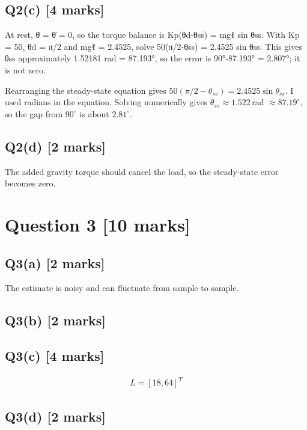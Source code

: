 \documentclass[11pt,a4paper]{article}
\begin{document}
\subsection*{Q2(c) \hfill [4 marks]}

At rest, θ̇ = θ̈ = 0, so the torque balance is Kp(θd-θss) = mgℓ sin θss.
With Kp = 50, θd = π/2 and mgℓ = 2.4525, solve 50(π/2-θss) = 2.4525 sin θss.
This gives θss approximately 1.52181 rad = 87.193°, so the error is 90°-87.193° = 2.807°; it is not zero.\par\smallskip Rearranging the steady-state equation gives $50(\pi/2-\theta_{ss})=2.4525\sin\theta_{ss}$. I used radians in the equation. Solving numerically gives $\theta_{ss}\approx1.522\,$rad $\approx87.19^\circ$, so the gap from $90^\circ$ is about $2.81^\circ$.

\subsection*{Q2(d) \hfill [2 marks]}

The added gravity torque should cancel the load, so the steady-state error becomes zero. 
\section*{Question 3 \hfill [10 marks]}
\subsection*{Q3(a) \hfill [2 marks]}

The estimate is noisy and can fluctuate from sample to sample.

\subsection*{Q3(b) \hfill [2 marks]}

\vspace{2mm}

\subsection*{Q3(c) \hfill [4 marks]}

\[\begin{aligned}L = [18,64]^T\end{aligned}\]

\subsection*{Q3(d) \hfill [2 marks]}
\end{document}
